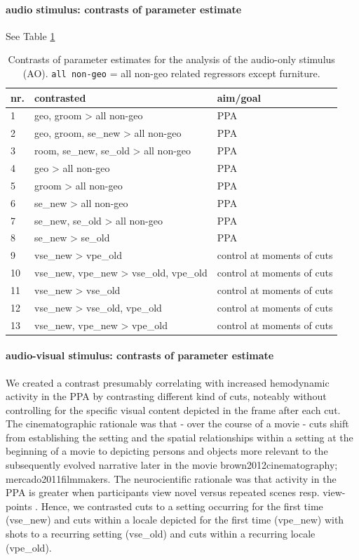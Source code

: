 \documentclass[english]{article}
\begin{document}
\paragraph{audio stimulus: contrasts of parameter estimate}
See Table \ref{tab:ao-contrasts}

\begin{table}[t]
\caption{Contrasts of parameter estimates for the analysis of the audio-only
    stimulus (AO).
\texttt{all non-geo} = all non-geo related regressors except furniture.}
\label{tab:ao-contrasts}
\footnotesize
\begin{tabular}{lll}
\toprule
\textbf{nr.} &  \textbf{contrasted} & \textbf{aim/goal} \\
\midrule
1 & geo, groom > all non-geo & PPA \tabularnewline
2 & geo, groom, se\_new > all non-geo & PPA \tabularnewline
3 & room, se\_new, se\_old > all non-geo & PPA \tabularnewline
4 & geo > all non-geo & PPA \tabularnewline
5 & groom > all non-geo & PPA \tabularnewline
6 & se\_new > all non-geo & PPA \tabularnewline
7 & se\_new, se\_old > all non-geo & PPA \tabularnewline
8 & se\_new > se\_old & PPA \tabularnewline
9 & vse\_new > vpe\_old & control at moments of cuts \tabularnewline
10 & vse\_new, vpe\_new > vse\_old, vpe\_old & control at moments of cuts \tabularnewline
11 & vse\_new > vse\_old & control at moments of cuts \tabularnewline
12 & vse\_new > vse\_old, vpe\_old & control at moments of cuts \tabularnewline
13 & vse\_new, vpe\_new > vpe\_old & control at moments of cuts \tabularnewline
\end{tabular}
\end{table}


\paragraph{audio-visual stimulus: contrasts of parameter estimate}
We created a contrast presumably correlating with increased hemodynamic activity
in the PPA by contrasting different kind of cuts, noteably without controlling
for the specific visual content depicted in the frame after each cut.
The cinematographic rationale was that - over the course of a movie - cuts shift
from establishing the setting and the spatial relationships within a setting at
the beginning of a movie to depicting persons and objects more relevant to the
subsequently evolved narrative later in the movie {brown2012cinematography;
mercado2011filmmakers}.
The neurocientific rationale was that activity in the PPA is greater when
participants view novel versus repeated scenes resp. view-points
\citep{epstein1999parahippocampal}.
Hence, we contrasted cuts to a setting occurring for the first time (vse\_new)
and cuts within a locale depicted for the first time (vpe\_new) with shots to a
recurring setting (vse\_old) and cuts within a recurring locale (vpe\_old).
\end{document}
